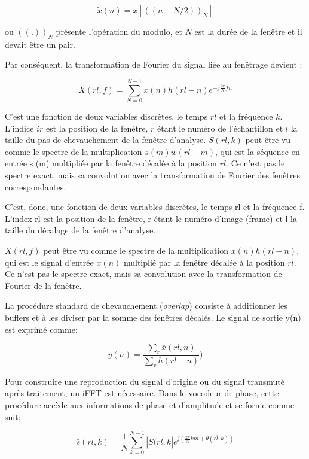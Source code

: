 \begin{equation}
    \tilde{x}(n) = x[((n-N/2))_N] 
\end{equation}

ou $((.))_N$ présente l'opération du modulo, et $N$ est la durée de la fenêtre et il devait être un pair.


Par conséquent, la transformation de Fourier du signal liée au fenêtrage devient :

\begin{equation}
    X(rl,f) = \sum_{N=0}^{N-1} x(n) h(rl-n) e^{-j \frac{2 \pi}{N} fn}
\end{equation}

C'est une fonction de deux variables discrètes, le temps $ rl $ et la fréquence $ k $. L'indice $ ir $ est la position de la fenêtre, $r$ étant le numéro de l’échantillon et $l$ la taille du pas de chevauchement de la fenêtre d'analyse. $ S (rl, k) $ peut être vu comme le spectre de la multiplication $ s (m) w (rl-m) $, qui est la séquence en entrée s (m) multipliée par la fenêtre décalée à la position $ rl $. Ce n'est pas le spectre exact, mais sa convolution avec la transformation de Fourier des fenêtres correspondantes.

C’est, donc, une fonction de deux variables discrètes, le temps rl et la fréquence f. L’index rl
est la position de la fenêtre, r étant le numéro d’image (frame) et l la taille du décalage de la
fenêtre d’analyse.

$ X (rl, f) $ peut être vu comme le spectre de la multiplication $ x (n) h (rl-n) $, qui est le signal d'entrée $ x (n) $ multiplié par la fenêtre décalée à la position $ rl $. Ce n'est pas le spectre exact, mais sa convolution avec la transformation de Fourier de la fenêtre.

La procédure standard de chevauchement (\textit{overlap}) consiste à additionner les buffers et à les diviser par la somme des fenêtres décalés. Le signal de sortie y(n) est exprimé comme:

\begin{equation}
    y(n) = \frac{\sum_r \bar{x}(rl,n)}{\sum_r {h}(rl - n)})
\end{equation}

Pour construire une reproduction du signal d'origine ou du signal transmuté après traitement, un iFFT est nécessaire. Dans le vocodeur de phase, cette procédure accède aux informations de phase et d'amplitude et se forme comme suit:

\begin{equation}
    \bar{s}(rl,k) = \frac{1}{N}\sum_{k=0}^{N-1} |\bar{S}(rl,k| e^{j (\frac{2 \pi}{N} km + \theta(r \bar{l},k))}
\end{equation}

